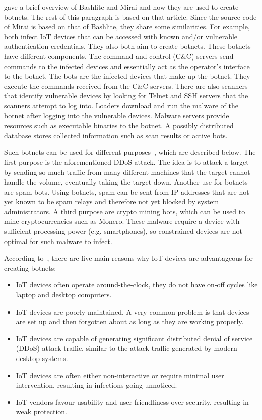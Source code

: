  
\cite{article:evOfBashlite} gave a brief overview of Bashlite and Mirai and how they are used to create botnets. The rest of this paragraph is based on that article.
Since the source code of Mirai is based on that of Bashlite, they share some similarities. For example, both infect IoT devices that can be accessed with known and/or vulnerable authentication credentials. They also both aim to create botnets. These botnets have different components. The command and control (C\&C) servers send commands to the infected devices and essentially act as the operator's interface to the botnet. The bots are the infected devices that make up the botnet. They execute the commands received from the C\&C servers. There are also scanners that identify vulnerable devices by looking for Telnet and SSH servers that the scanners attempt to log into. Loaders download and run the malware of the botnet after logging into the vulnerable devices. Malware servers provide resources such as executable binaries to the botnet. A possibly distributed database stores collected information such as scan results or active bots.

Such botnets can be used for different purposes~\cite{website:IBMIoT}, which  are described below. The first purpose is the aforementioned DDoS attack. The idea is to attack a target by sending so much traffic from many different machines that the target cannot handle the volume, eventually taking the target down. Another use for botnets are spam bots. Using botnets, spam can be sent from IP addresses that are not yet known to be spam relays and therefore not yet blocked by system administrators. A third purpose are crypto mining bots, which can be used to mine cryptocurrencies such as Monero. These malware require a device with sufficient processing power (e.g. smartphones), so constrained devices are not optimal for such malware to infect.

According to~\cite{article:DDoSinIoT}, there are five main reasons why IoT devices are advantageous for creating botnets:
\begin{itemize}
\item IoT devices often operate around-the-clock, they do not have on-off cycles like laptop and desktop computers. 
    \item IoT devices are poorly maintained. A very common problem is that devices are set up and then forgotten about as long as they are working properly. 
    \item IoT devices are capable of generating significant distributed denial of service (DDoS) attack traffic, similar to the attack traffic generated by modern desktop systems. 
    \item IoT devices are often either non-interactive or require minimal user intervention, resulting in infections going unnoticed. 
\item IoT vendors favour usability and user-friendliness over security, resulting in weak protection.
\end{itemize}

